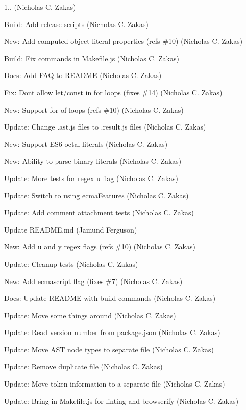 \begin{DoxyItemize}
\item 1.. (Nicholas C. Zakas)
\item Build\+: Add release scripts (Nicholas C. Zakas)
\item New\+: Add computed object literal properties (refs \#10) (Nicholas C. Zakas)
\item Build\+: Fix commands in Makefile.\+js (Nicholas C. Zakas)
\item Docs\+: Add FAQ to README (Nicholas C. Zakas)
\item Fix\+: Don\textquotesingle{}t allow let/const in for loops (fixes \#14) (Nicholas C. Zakas)
\item New\+: Support for-\/of loops (refs \#10) (Nicholas C. Zakas)
\item Update\+: Change .ast.\+js files to .result.\+js files (Nicholas C. Zakas)
\item New\+: Support ES6 octal literals (Nicholas C. Zakas)
\item New\+: Ability to parse binary literals (Nicholas C. Zakas)
\item Update\+: More tests for regex u flag (Nicholas C. Zakas)
\item Update\+: Switch to using ecma\+Features (Nicholas C. Zakas)
\item Update\+: Add comment attachment tests (Nicholas C. Zakas)
\item Update README.\+md (Jamund Ferguson)
\item New\+: Add u and y regex flags (refs \#10) (Nicholas C. Zakas)
\item Update\+: Cleanup tests (Nicholas C. Zakas)
\item New\+: Add ecmascript flag (fixes \#7) (Nicholas C. Zakas)
\item Docs\+: Update README with build commands (Nicholas C. Zakas)
\item Update\+: Move some things around (Nicholas C. Zakas)
\item Update\+: Read version number from package.\+json (Nicholas C. Zakas)
\item Update\+: Move AST node types to separate file (Nicholas C. Zakas)
\item Update\+: Remove duplicate file (Nicholas C. Zakas)
\item Update\+: Move token information to a separate file (Nicholas C. Zakas)
\item Update\+: Bring in Makefile.\+js for linting and browserify (Nicholas C. Zakas)

\end{DoxyItemize}
